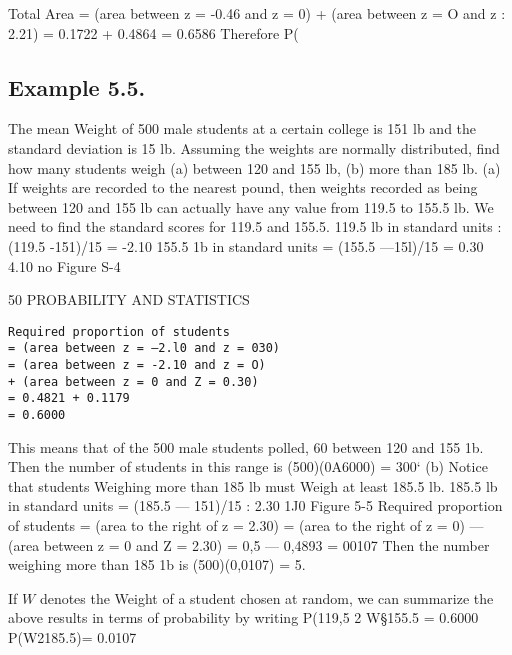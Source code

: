 
Total Area = (area between z = -0.46 and z = 0) +
(area between z = O and z : 2.21)
= 0.1722 + 0.4864
= 0.6586
Therefore P(%
\subsection{Example 5.5.} 
The mean Weight of 500 male students at a certain
college is 151 lb and the standard deviation is 15 lb. Assuming the
weights are normally distributed, ﬁnd how many students weigh (a)
between 120 and 155 lb, (b) more than 185 lb.
(a) If weights are recorded to the nearest pound, then weights recorded
as being between 120 and 155 lb can actually have any value from 119.5
to 155.5 lb.
We need to ﬁnd the standard scores for 119.5 and 155.5.
119.5 lb in standard units : (119.5 -151)/15
= -2.10
155.5 1b in standard units = (155.5 —15l)/15
= 0.30
4.10 no
Figure S-4


50 PROBABILITY AND STATISTICS
\begin{verbatim}
Required proportion of students
= (area between z = —2.l0 and z = 030)
= (area between z = -2.10 and z = O)
+ (area between z = 0 and Z = 0.30)
= 0.4821 + 0.1179
= 0.6000
\end{verbatim}

This means that of the 500 male students polled, 60%
between 120 and 155 1b. Then the number of students in this range is
(500)(0A6000) = 300‘
(b) Notice that students Weighing more than 185 lb must Weigh at least
185.5 lb.
185.5 lb in standard units = (185.5 — 151)/15
: 2.30
1J0
Figure 5-5
Required proportion of students
= (area to the right of z = 2.30)
= (area to the right of z = 0)
— (area between z = 0 and Z = 2.30)
= 0,5 — 0,4893
= 00107
Then the number weighing more than 185 1b is (500)(0,0107) = 5.



If $W$ denotes the Weight of a student chosen at random, we can summarize the above results in terms of probability by writing
P(119,5 2 W§155.5 = 0.6000 P(W2185.5)= 0.0107
